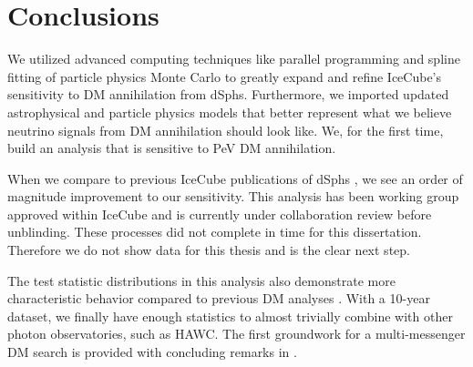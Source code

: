 \section{Conclusions} \label{sec:icDM_conclude}

We utilized advanced computing techniques like parallel programming and spline fitting of particle physics Monte Carlo to greatly expand and refine IceCube's sensitivity to DM annihilation from dSphs.
Furthermore, we imported updated astrophysical and particle physics models that better represent what we believe neutrino signals from DM annihilation should look like.
We, for the first time, build an analysis that is sensitive to PeV DM annihilation.

When we compare to previous IceCube publications of dSphs \cite{IC3_DM2013}, we see an order of magnitude improvement to our sensitivity.
This analysis has been working group approved within IceCube and is currently under collaboration review before unblinding.
These processes did not complete in time for this dissertation.
Therefore we do not show data for this thesis and is the clear next step.

The test statistic distributions in this analysis also demonstrate more characteristic behavior compared to previous DM analyses \cite{Minjin_icrc23,IC3_nulines}.
With a 10-year dataset, we finally have enough statistics to almost trivially combine with other photon observatories, such as HAWC.
The first groundwork for a multi-messenger DM search is provided with concluding remarks in .
